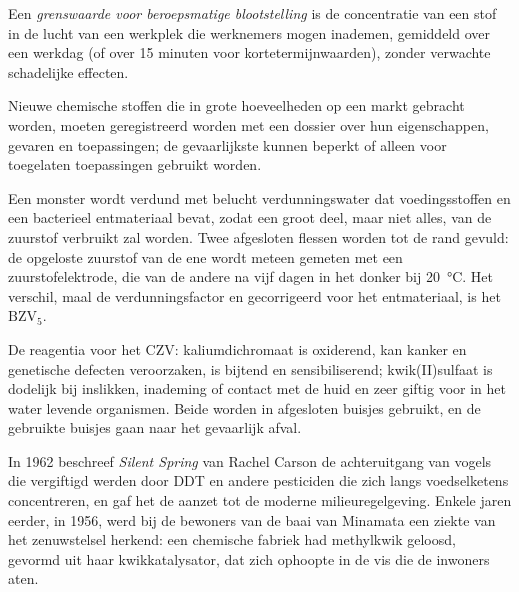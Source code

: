 \begin{definition}\label{def:b3:environmental-toxicology:oel}
Een
\emph{grenswaarde voor beroepsmatige blootstelling}
is de concentratie van een stof in de lucht van een werkplek die
werknemers mogen inademen, gemiddeld over een werkdag (of over 15 minuten
voor kortetermijnwaarden), zonder verwachte schadelijke effecten.
\end{definition}

Nieuwe chemische stoffen die in grote hoeveelheden op een markt gebracht
worden, moeten geregistreerd worden met een dossier over hun
eigenschappen, gevaren en toepassingen; de gevaarlijkste kunnen beperkt
of alleen voor toegelaten toepassingen gebruikt worden.

\begin{inthelab}
Een monster wordt verdund met belucht verdunningswater dat
voedingsstoffen en een bacterieel entmateriaal bevat, zodat een groot
deel, maar niet alles, van de zuurstof verbruikt zal worden. Twee
afgesloten flessen worden tot de rand gevuld: de opgeloste zuurstof van
de ene wordt meteen gemeten met een zuurstofelektrode, die van de andere
na vijf dagen in het donker bij
\qty{20}{\celsius}. Het verschil, maal de verdunningsfactor en
gecorrigeerd voor het entmateriaal, is het
$\mathrm{BZV_5}$.
\end{inthelab}

\begin{safety}{}
De reagentia voor het CZV: kaliumdichromaat is oxiderend, kan kanker en
genetische defecten veroorzaken, is bijtend en sensibiliserend;
kwik(II)sulfaat is dodelijk bij inslikken, inademing of contact met de
huid en zeer giftig voor in het water levende organismen. Beide worden
in afgesloten buisjes gebruikt, en de gebruikte buisjes gaan naar het
gevaarlijk afval.
\end{safety}

\begin{history}
In 1962 beschreef \textit{Silent Spring} van Rachel Carson de achteruitgang
van vogels die vergiftigd werden door DDT en andere pesticiden die zich
langs voedselketens concentreren, en gaf het de aanzet tot de moderne
milieuregelgeving. Enkele jaren eerder, in 1956, werd bij de bewoners van
de baai van Minamata een ziekte van het zenuwstelsel herkend: een
chemische fabriek had methylkwik geloosd, gevormd uit haar
kwikkatalysator, dat zich ophoopte in de vis die de inwoners aten.
\end{history}

